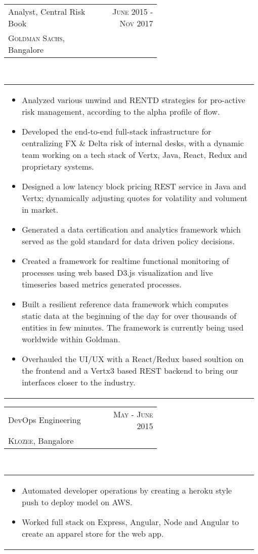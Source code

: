 \documentclass[a4paper]{article} %
\newcommand{\verticalspacing}{-0.25cm}
\newcommand{\bulletspace}{0.7cm}
\newcommand{\projectheadspacing}{6.9cm}
\newcommand{\cproject}[5]{%
    \begin{tabular}{p{0.60\linewidth}r}
        \textcolor{NavyBlue}{\small #2} & \multicolumn{1}{m{ \projectheadspacing{} }}{\raggedleft \small {\textsc{#1}}}\\
        \small {#3} & \small {#4}
    \end{tabular}\\
    \begin{tabular}{p{0.98\linewidth}}
    \vspace{-0.3cm}
        \small{#5}
    \end{tabular}
    \vspace{\verticalspacing{}}
}
\begin{document}
\cproject
      {June 2015 - Nov 2017}
      {Analyst, Central Risk Book}
      {\textsc{Goldman Sachs}, Bangalore}
      {}
      {%
        \begin{itemize}[leftmargin=\bulletspace{}]
          \item Analyzed various unwind and RENTD strategies for pro-active risk management, according
                to the alpha profile of flow.
          \item Developed the end-to-end full-stack infrastructure for centralizing FX \& Delta risk of
                internal desks, with a dynamic team working on a tech stack of Vertx, Java, React, Redux
                and proprietary systems.
          \item Designed a low latency block pricing REST service in Java and Vertx; dynamically adjusting
                quotes for volatility and volument in market.
          \item Generated a data certification and analytics framework which served as the gold standard for
                data driven policy decisions.
          \item Created a framework for realtime functional monitoring of processes using web based
                D3.js visualization and live timeseries based metrics generated processes.
          \item Built a resilient reference data framework which computes static data at the beginning of
                the day for over thousands of entities in few minutes. The framework is currently being used
                worldwide within Goldman.
          \item Overhauled the UI/UX with a React/Redux based soultion on the frontend and a Vertx3 based REST
                backend to bring our interfaces closer to the industry.
        \end{itemize}
      }

\cproject
      {May - June 2015}
      {DevOps Engineering}
      {\textsc{Klozee}, Bangalore}
      {}
      {%
        \begin{itemize}[leftmargin=\bulletspace{}]
          \item Automated developer operations by creating a heroku style push to deploy model on AWS.
          \item Worked full stack on Express, Angular, Node and Angular to create an apparel store for the web app.
        \end{itemize}
      }
\end{document}
